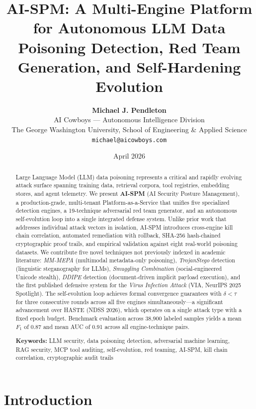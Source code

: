 \documentclass[11pt,twocolumn]{article}
\title{\textbf{AI-SPM: A Multi-Engine Platform for Autonomous LLM Data Poisoning Detection, Red Team Generation, and Self-Hardening Evolution}}
\author{
  \textbf{Michael J. Pendleton}\\
  AI Cowboys --- Autonomous Intelligence Division\\
  The George Washington University, School of Engineering \& Applied Science\\
  \texttt{michael@aicowboys.com}
}
\date{April 2026}
\begin{document}
\maketitle
\thispagestyle{fancy}

\begin{abstract}
Large Language Model (LLM) data poisoning represents a critical and rapidly evolving attack surface spanning training data, retrieval corpora, tool registries, embedding stores, and agent telemetry. We present \textbf{AI-SPM} (AI Security Posture Management), a production-grade, multi-tenant Platform-as-a-Service that unifies five specialized detection engines, a 19-technique adversarial red team generator, and an autonomous self-evolution loop into a single integrated defense system. Unlike prior work that addresses individual attack vectors in isolation, AI-SPM introduces cross-engine kill chain correlation, automated remediation with rollback, SHA-256 hash-chained cryptographic proof trails, and empirical validation against eight real-world poisoning datasets. We contribute five novel techniques not previously indexed in academic literature: \textit{MM-MEPA} (multimodal metadata-only poisoning), \textit{TrojanStego} detection (linguistic steganography for LLMs), \textit{Smuggling Combination} (social-engineered Unicode stealth), \textit{DDIPE} detection (document-driven implicit payload execution), and the first published defensive system for the \textit{Virus Infection Attack} (VIA, NeurIPS 2025 Spotlight). The self-evolution loop achieves formal convergence guarantees with $\delta < \tau$ for three consecutive rounds across all five engines simultaneously---a significant advancement over HASTE (NDSS 2026), which operates on a single attack type with a fixed epoch budget. Benchmark evaluation across 38,900 labeled samples yields a mean $F_1$ of 0.87 and mean AUC of 0.91 across all engine-technique pairs.

\medskip
\noindent\textbf{Keywords:} LLM security, data poisoning detection, adversarial machine learning, RAG security, MCP tool auditing, self-evolution, red teaming, AI-SPM, kill chain correlation, cryptographic audit trails
\end{abstract}

\section{Introduction}
\label{sec:intro}
\end{document}
